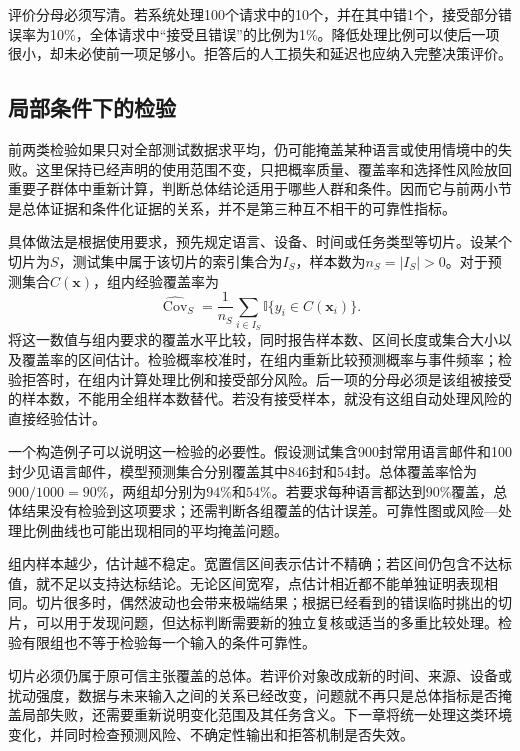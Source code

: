 评价分母必须写清。若系统处理100个请求中的10个，并在其中错1个，接受部分错误率为10\%，全体请求中“接受且错误”的比例为1\%。降低处理比例可以使后一项很小，却未必使前一项足够小。拒答后的人工损失和延迟也应纳入完整决策评价。

\subsection{局部条件下的检验}
\label{sec:reliability-conditional-evaluation}

前两类检验如果只对全部测试数据求平均，仍可能掩盖某种语言或使用情境中的失败。这里保持已经声明的使用范围不变，只把概率质量、覆盖率和选择性风险放回重要子群体中重新计算，判断总体结论适用于哪些人群和条件。因而它与前两小节是总体证据和条件化证据的关系，并不是第三种互不相干的可靠性指标。

具体做法是根据使用要求，预先规定语言、设备、时间或任务类型等切片。设某个切片为$S$，测试集中属于该切片的索引集合为$I_S$，样本数为$n_S=|I_S|>0$。对于预测集合$C(\bm{x})$，组内经验覆盖率为
\begin{equation}
 \widehat{\operatorname{Cov}}_S
 =\frac1{n_S}\sum_{i\in I_S}
   \mathbb I\{y_i\in C(\bm{x}_i)\}.
 \label{eq:reliability-group-coverage}
\end{equation}
将这一数值与组内要求的覆盖水平比较，同时报告样本数、区间长度或集合大小以及覆盖率的区间估计。检验概率校准时，在组内重新比较预测概率与事件频率；检验拒答时，在组内计算处理比例和接受部分风险。后一项的分母必须是该组被接受的样本数，不能用全组样本数替代。若没有接受样本，就没有这组自动处理风险的直接经验估计。

一个构造例子可以说明这一检验的必要性。假设测试集含900封常用语言邮件和100封少见语言邮件，模型预测集合分别覆盖其中846封和54封。总体覆盖率恰为$900/1000=90\%$，两组却分别为$94\%$和$54\%$。若要求每种语言都达到90\%覆盖，总体结果没有检验到这项要求；还需判断各组覆盖的估计误差。可靠性图或风险—处理比例曲线也可能出现相同的平均掩盖问题。

组内样本越少，估计越不稳定。宽置信区间表示估计不精确；若区间仍包含不达标值，就不足以支持达标结论。无论区间宽窄，点估计相近都不能单独证明表现相同。切片很多时，偶然波动也会带来极端结果；根据已经看到的错误临时挑出的切片，可以用于发现问题，但达标判断需要新的独立复核或适当的多重比较处理。检验有限组也不等于检验每一个输入的条件可靠性。

切片必须仍属于原可信主张覆盖的总体。若评价对象改成新的时间、来源、设备或扰动强度，数据与未来输入之间的关系已经改变，问题就不再只是总体指标是否掩盖局部失败，还需要重新说明变化范围及其任务含义。下一章将统一处理这类环境变化，并同时检查预测风险、不确定性输出和拒答机制是否失效。

